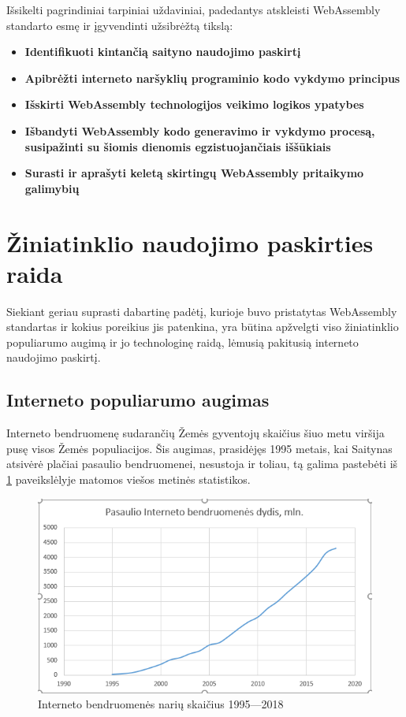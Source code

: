 \documentclass{VUMIFPSkursinis}
\begin{document}
Išsikelti pagrindiniai tarpiniai uždaviniai, padedantys atskleisti WebAssembly standarto esmę ir įgyvendinti užsibrėžtą tikslą:
\begin{itemize}
    \item \textbf{Identifikuoti kintančią saityno naudojimo paskirtį}
    \item \textbf{Apibrėžti interneto naršyklių programinio kodo vykdymo principus}
    \item \textbf{Išskirti WebAssembly technologijos veikimo logikos ypatybes} 
    \item \textbf{Išbandyti WebAssembly kodo generavimo ir vykdymo procesą, susipažinti su šiomis dienomis egzistuojančiais iššūkiais}
    \item \textbf{Surasti ir aprašyti keletą skirtingų WebAssembly pritaikymo galimybių}
\end{itemize}

\section{Žiniatinklio naudojimo paskirties raida}

Siekiant geriau suprasti dabartinę padėtį, kurioje buvo pristatytas WebAssembly standartas ir kokius poreikius jis patenkina, yra būtina apžvelgti viso žiniatinklio populiarumo augimą ir jo technologinę raidą, lėmusią pakitusią interneto naudojimo paskirtį.

\subsection{Interneto populiarumo augimas}

Interneto bendruomenę sudarančių Žemės gyventojų skaičius šiuo metu viršija pusę visos Žemės populiacijos. Šis augimas, prasidėjęs 1995 metais, kai Saitynas atsivėrė plačiai pasaulio bendruomenei, nesustoja ir toliau, tą galima pastebėti iš \ref{fig:internet_usage} paveikslėlyje matomos viešos metinės statistikos.

\begin{figure}[h!]
  \includegraphics[scale=1]{interneto_naudojimo_statistika.png}
  \caption{Interneto bendruomenės narių skaičius 1995—2018 \cite{IWS19}}
  \label{fig:internet_usage}
\end{figure}
\end{document}
